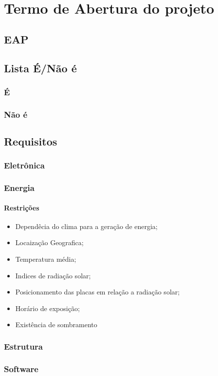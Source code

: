 \chapter{Termo de Abertura do projeto}

\section{EAP}
\section{Lista É/Não é}
\subsection{É}
\subsection{Não é}
\section{Requisitos}
\subsection{Eletrônica}
\subsection{Energia}
\subsubsection{Restrições}
\begin{itemize}
   \item Dependêcia do clima para a geração de energia;
   \item Locaização Geografica;
   \item Temperatura média;
   \item Indices de radiação solar;
   \item Posicionamento das placas em relação a radiação solar;
   \item Horário de exposição;
   \item Existência de sombramento
 \end{itemize}
\subsection{Estrutura}
\subsection{Software}
